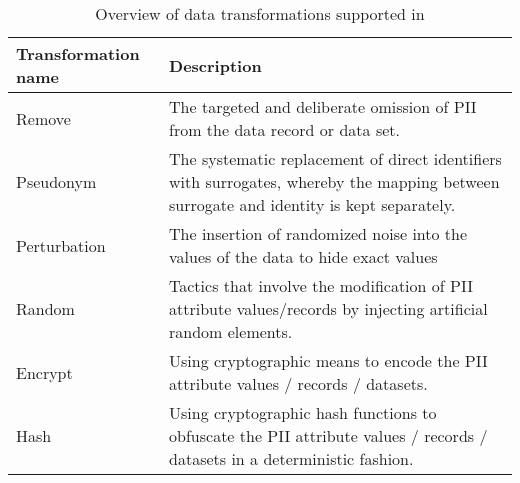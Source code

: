 \begin{table}[h]
\begin{center}
\begin{tabulary}{\textwidth}{p{0.20\textwidth}p{0.8\textwidth}}
\textbf{Transformation name} & \textbf{Description}                                                                                                                                                          \\ \hline
Remove               & The targeted and deliberate omission of PII from the data record or data set.                                                                                                 \\
Pseudonym            & The systematic replacement of direct identifiers with surrogates, whereby the mapping between surrogate and identity is kept separately.                                      \\
Perturbation         & The insertion of randomized noise into the values of the data to hide exact values                                                                                 \\
Random               & Tactics that involve the modification of PII attribute values/records by injecting artificial random elements.                                                                \\
Encrypt              & Using cryptographic means to encode the PII attribute values / records / datasets.                                                                                            \\
Hash                 & Using cryptographic hash functions to obfuscate the PII attribute values / records / datasets in a deterministic fashion.                                                                                            \\
\end{tabulary}
\caption{Overview of data transformations supported in \middleware{}}
\label{table:supported-transformations}
\end{center}
\end{table}